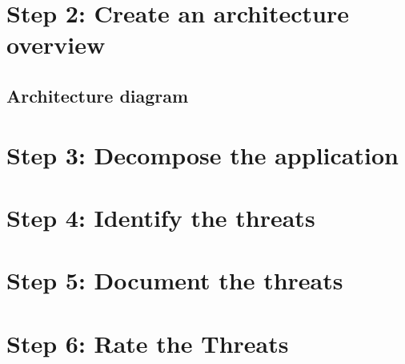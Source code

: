 \documentclass[a4paper, 11pt]{article}
\begin{document}
\section*{Step 2: Create an architecture overview}
\setcounter{section}{2}
\subsection{Architecture diagram}



\section*{Step 3: Decompose the application}


\section*{Step 4: Identify the threats}


\section*{Step 5: Document the threats}


\section*{Step 6: Rate the Threats}
\end{document}

